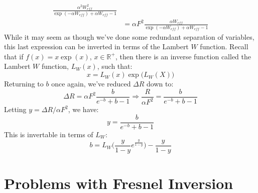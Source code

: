 \documentclass[crop=false,class=book,oneside]{standalone}
\begin{document}
\begin{definition}
\begin{subequations}
\begin{align}
                    \frac{\alpha^{2}W_{eff}^{2}}
                        {\exp(\minus\alpha{W}_{eff})
                         +\alpha{W}_{eff}-1}\\
                    &=\alpha{F}^{2}\frac{\alpha{W}_{eff}}
                        {\exp(\minus\alpha{W}_{eff})
                         +\alpha W_{eff}-1}
                \end{align}
            \end{subequations}
            While it may seem as though we've done some redundant
            separation of variables, this last expression can be
            inverted in terms of the Lambert $W$ function. Recall
            that if $f(x)=x\exp(x)$, $x\in\mathbb{R}^{+}$, then there
            is an inverse function called the Lambert $W$ function,
            $L_{W}(x)$, such that:
            \begin{equation}
                x=L_{W}(x)\exp\big(L_{W}(X)\big)
            \end{equation}
            Returning to $b$ once again, we've reduced
            $\Delta{R}$ down to:
            \begin{equation*}
                \Delta{R}=\alpha{F}^2
                    \frac{b}{e^{-b}+b-1}\Rightarrow
                    \frac{R}{\alpha F^2} = \frac{b}{e^{-b}+b-1}
            \end{equation*}
            Letting $y=\Delta{R}/\alpha{F}^{2}$, we have:
            \begin{equation}
                y=\frac{b}{e^{-b}+b-1}
            \end{equation}
            This is invertable in terms of $L_{W}$:
            \begin{equation*}
                b=L_{W}\bigg(\frac{y}{1-y}e^{\frac{y}{1-y}}\bigg) - \frac{y}{1-y}
            \end{equation*}
            \end{definition}
    \section{Problems with Fresnel Inversion}
\end{document}
